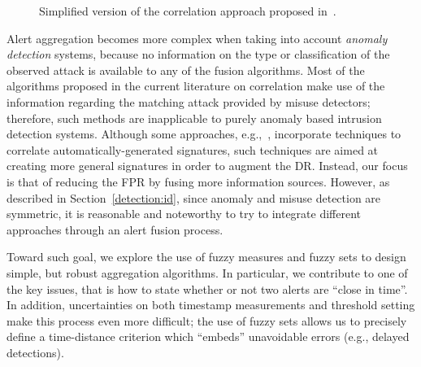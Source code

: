 \begin{figure}[t]
  \centering
  \caption{Simplified version of the correlation approach proposed
    in~\citep{valeur04comprehensive}.}
  \label{fig:correlation_model}
\end{figure}

Alert aggregation becomes more complex when taking into account
\emph{anomaly detection} systems, because no information on the type
or classification of the observed attack is available to any of the
fusion algorithms. Most of the algorithms proposed in the current
literature on correlation make use of the information regarding the
matching attack provided by misuse detectors; therefore, such methods
are inapplicable to purely anomaly based intrusion detection
systems. Although some approaches, e.g.,~\citep{1224380}, incorporate
techniques to correlate automatically-generated signatures, such
techniques are aimed at creating more general signatures in order to
augment the DR. Instead, our focus is that of reducing the FPR by
fusing more information sources. However, as described in
Section~\ref{detection:id}, since anomaly and misuse detection are
symmetric, it is reasonable and noteworthy to try to integrate
different approaches through an alert fusion process.

Toward such goal, we explore the use of fuzzy measures
\citep{fuzzymeasure} and fuzzy sets \citep{folger_klir} to design
simple, but robust aggregation algorithms. In particular, we
contribute to one of the key issues, that is how to state whether or
not two alerts are ``close in time''. In addition, uncertainties on
both timestamp measurements and threshold setting make this process
even more difficult; the use of fuzzy sets allows us to precisely
define a time-distance criterion which ``embeds'' unavoidable errors
(e.g., delayed detections).

